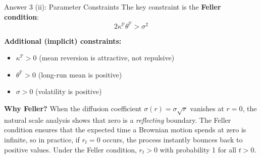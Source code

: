 \documentclass[compress]{beamer}
\begin{document}
\begin{frame}{Answer 3 (ii): Parameter Constraints}
    \small
    The key constraint is the \textbf{Feller condition}:
    \[
        \boxed{2\kappa^{\mathbb{P}}\theta^{\mathbb{P}} > \sigma^2}
    \]
    
    \vspace{1em}
    
    \textbf{Additional (implicit) constraints:}
    \begin{itemize}
        \item $\kappa^{\mathbb{P}} > 0$ (mean reversion is attractive, not repulsive)
        \item $\theta^{\mathbb{P}} > 0$ (long-run mean is positive)
        \item $\sigma > 0$ (volatility is positive)
    \end{itemize}
    
    \vspace{1em}
    
    \textbf{Why Feller?} When the diffusion coefficient $\sigma(r) = \sigma\sqrt{r}$ vanishes at $r = 0$, the natural scale analysis shows that zero is a \textit{reflecting} boundary. The Feller condition ensures that the expected time a Brownian motion spends at zero is infinite, so in practice, if $r_t = 0$ occurs, the process instantly bounces back to positive values. Under the Feller condition, $r_t > 0$ with probability 1 for all $t > 0$.
\end{frame}
\end{document}
